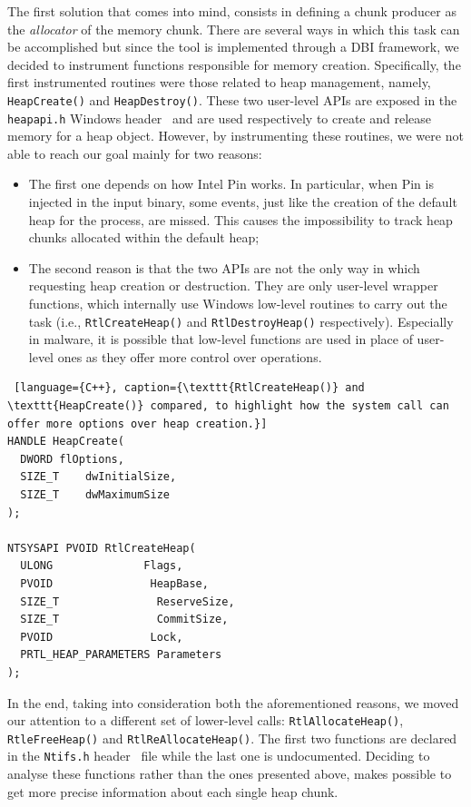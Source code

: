 \documentclass[LaM,binding=0.6cm]{sapthesis}
\begin{document}
The first solution that comes into mind, consists in defining a chunk producer as the \textit{allocator} of the memory chunk. There are several ways in which this task can be accomplished but since the tool is implemented through a DBI framework, we decided to instrument functions responsible for memory creation. Specifically, the first instrumented routines were those related to heap management, namely, \texttt{HeapCreate()} and \texttt{HeapDestroy()}. These two user-level APIs are exposed in the \texttt{heapapi.h} Windows header~\cite{heapapih77:online} and are used respectively to create and release memory for a heap object. However, by instrumenting these routines, we were not able to reach our goal mainly for two reasons:
\begin{itemize}
\item The first one depends on how Intel Pin works. In particular, when Pin is injected in the input binary, some events, just like the creation of the default heap for the process, are missed. This causes the impossibility to track heap chunks allocated within the default heap;
\item The second reason is that the two APIs are not the only way in which requesting heap creation or destruction. They are only user-level wrapper functions, which internally use Windows low-level routines to carry out the task (i.e., \texttt{RtlCreateHeap()} and \texttt{RtlDestroyHeap()} respectively). Especially in malware, it is possible that low-level functions are used in place of user-level ones as they offer more control over operations.
\end{itemize} 

\clearpage
\begin{lstlisting} [language={C++}, caption={\texttt{RtlCreateHeap()} and \texttt{HeapCreate()} compared, to highlight how the system call can offer more options over heap creation.}]
HANDLE HeapCreate(
  DWORD	flOptions,
  SIZE_T 	dwInitialSize,
  SIZE_T 	dwMaximumSize
);

NTSYSAPI PVOID RtlCreateHeap(
  ULONG              Flags,
  PVOID               HeapBase,
  SIZE_T               ReserveSize,
  SIZE_T               CommitSize,
  PVOID               Lock,
  PRTL_HEAP_PARAMETERS Parameters
);
\end{lstlisting}

\noindent
In the end, taking into consideration both the aforementioned reasons, we moved our attention to a different set of lower-level calls: \texttt{RtlAllocateHeap()}, \texttt{RtleFreeHeap()} and \texttt{RtlReAllocateHeap()}. The first two functions are declared in the \texttt{Ntifs.h} header~\cite{Ntifshhe84:online} file while the last one is undocumented. Deciding to analyse these functions rather than the ones presented above, makes possible to get more precise information about each single heap chunk.
\end{document}
